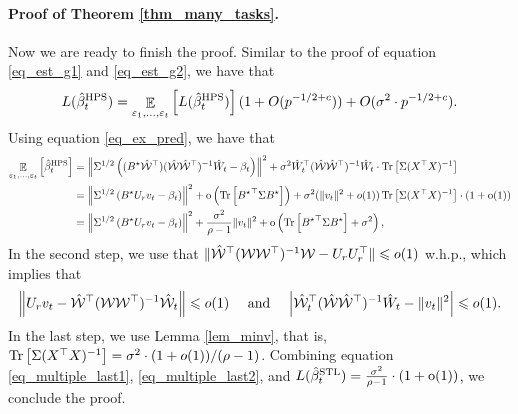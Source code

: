 	\paragraph{Proof of Theorem \ref{thm_many_tasks}.}
	Now we are ready to finish the proof.
	Similar to the proof of equation \eqref{eq_est_g1} and \eqref{eq_est_g2}, we have that
	\begin{align}
		L(\hat{\beta}_t^{\textup{HPS}}) = \mathop{\mathbb{E}}_{\varepsilon_1, \dots, \varepsilon_t}\left[ L(\hat{\beta}_t^{\textup{HPS}}) \right] (1 + O(p^{-1/2+c})) + O(\sigma^2 \cdot p^{-1/2 + c}). \label{eq_multiple_last1}
	\end{align}
	Using equation \eqref{eq_ex_pred}, we have that
	\begin{align}
		\mathop{\mathbb{E}}_{\varepsilon_1, \dots, \varepsilon_t}\left[ \hat{\beta}_t^{\textup{HPS}} \right] &= \left\| \Sigma^{1/2} \left((B^\star \hat{\mathcal W}^\top) (\hat{\mathcal W}\hat{\mathcal W}^{\top})^{-1} \hat W_t - \beta_t \right)  \right\|^2
		+ \sigma^2  \hat W_t^{\top} (\hat{\mathcal W}\hat{\mathcal W}^{\top})^{-1} \hat W_t \cdot \operatorname{Tr}\left[\Sigma (X^{\top}X)^{-1}\right] \nonumber \\
		&= \left\| \Sigma^{1/2} \left({B^{\star} U_r v_t-\beta_t}\right) \right\|^2 + \operatorname{o}\left(\operatorname{Tr}\left[{B^{\star}}^{\top} \Sigma B^{\star}\right]\right) + \sigma^2(\|v_t\|^2 + o(1)) \operatorname{Tr}\left[\Sigma (X^{\top}X)^{-1}\right] \cdot (1+\operatorname{o}(1)) \nonumber \\
		&= \left\| \Sigma^{1/2} \left({B^{\star} U_r v_t-\beta_t}\right) \right\|^2 + \frac{\sigma^2}{\rho-1}\|v_t\|^2 + \operatorname{o} \left( \operatorname{Tr}\left[{B^{\star}}^{\top} \Sigma B^{\star}\right] + \sigma^2\right), \label{eq_multiple_last2}
	\end{align}
	In the second step, we use that $\|\hat{{\mathcal W}}^{\top} ({\mathcal W} {\mathcal W}^{\top})^{-1} {\mathcal W} - U_r U_r^{\top}\| \leqslant o(1)$ w.h.p., which implies that
	\[ \left\| U_r v_t - \hat{{\mathcal W}}^{\top} ({\mathcal W} {\mathcal W}^{\top})^{-1} \hat{{\mathcal W}}_t \right\| \leqslant o(1) \quad \text{ and } \quad {\left| {\hat{{\mathcal W}}_t^{\top} (\hat{{\mathcal W}} \hat{{\mathcal W}}^{\top})^{-1} \hat{W}_t - \|v_t\|^2} \right|} \leqslant o(1). \]
  In the last step, we use Lemma \ref{lem_minv}, that is, $\operatorname{Tr}\left[\Sigma (X^{\top} X)^{-1}\right] = \sigma^2 \cdot (1 + o(1))/ (\rho - 1)$.
	Combining equation \eqref{eq_multiple_last1}, \eqref{eq_multiple_last2}, and $L(\hat{\beta}_t^{\textup{STL}})=\frac{\sigma^2}{\rho-1} \cdot \left( 1+\operatorname{o}(1)\right)$, we conclude the proof.
